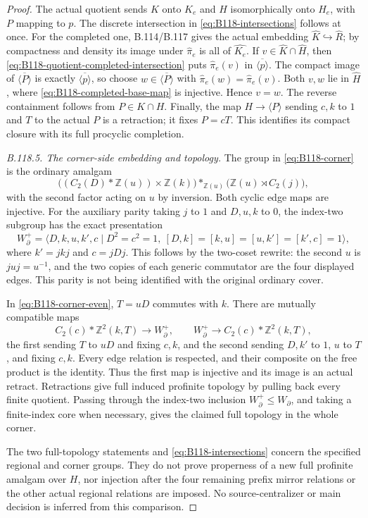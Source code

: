 \begin{proof}
The actual quotient sends $K$ onto $K_e$ and $H$ isomorphically onto
$H_e$, with $P$ mapping to $p$. The discrete intersection in
\eqref{eq:B118-intersections} follows at once. For the completed
one, B.114/B.117 gives the actual embedding
$\widehat K\hookrightarrow\widehat R$; by compactness and density
its image under $\widehat\pi_e$ is all of $\widehat{K_e}$.
If $v\in\widehat K\cap\widehat H$, then
\eqref{eq:B118-quotient-completed-intersection} puts
$\widehat\pi_e(v)$ in $\overline{\langle p\rangle}$.
The compact image of $\overline{\langle P\rangle}$ is exactly
$\overline{\langle p\rangle}$, so choose
$w\in\overline{\langle P\rangle}$ with
$\widehat\pi_e(w)=\widehat\pi_e(v)$. Both $v,w$ lie in
$\widehat H$, where \eqref{eq:B118-completed-base-map} is
injective. Hence $v=w$. The reverse containment follows from
$P\in K\cap H$. Finally, the map $H\to\langle P\rangle$
sending $c,k$ to $1$ and $T$ to the actual $P$ is a retraction;
it fixes $P=cT$. This identifies its compact closure with its full
procyclic completion.

\emph{B.118.5. The corner-side embedding and topology.}
The group in \eqref{eq:B118-corner} is the ordinary amalgam
\[
 \bigl((C_2(D)*\mathbb Z(u))\times\mathbb Z(k)\bigr)
       *_{\mathbb Z(u)}
       \bigl(\mathbb Z(u)\rtimes C_2(j)\bigr),
\]
with the second factor acting on $u$ by inversion. Both cyclic edge
maps are injective. For the auxiliary parity taking $j$ to $1$ and
$D,u,k$ to $0$, the index-two subgroup has the exact presentation
\begin{equation}\label{eq:B118-corner-even}
 W_{\partial}^{+}=
 \langle D,k,u,k',c\mid
 D^2=c^2=1,\ [D,k]=[k,u]=[u,k']=[k',c]=1\rangle,
\end{equation}
where $k'=jkj$ and $c=jDj$. This follows by the two-coset
rewrite: the second $u$ is $juj=u^{-1}$, and the two copies of
each generic commutator are the four displayed edges.
This parity is not being identified with the original ordinary cover.

In \eqref{eq:B118-corner-even}, $T=uD$ commutes with $k$.
There are mutually compatible maps
\[
 C_2(c)*\mathbb Z^2(k,T)\longrightarrow W_{\partial}^{+},
 \qquad
 W_{\partial}^{+}\longrightarrow C_2(c)*\mathbb Z^2(k,T),
\]
the first sending $T$ to $uD$ and fixing $c,k$, and the second
sending $D,k'$ to $1$, $u$ to $T$, and fixing $c,k$.
Every edge relation is respected, and their composite on the free
product is the identity. Thus the first map is injective and its
image is an actual retract. Retractions give full induced profinite
topology by pulling back every finite quotient. Passing through the
index-two inclusion $W_{\partial}^{+}\leq W_{\partial}$, and
taking a finite-index core when necessary, gives the claimed full
topology in the whole corner.

The two full-topology statements and
\eqref{eq:B118-intersections} concern the specified regional and
corner groups. They do not prove properness of a new full profinite
amalgam over $H$, nor injection after the four remaining prefix
mirror relations or the other actual regional relations are imposed.
No source-centralizer or main decision is inferred from this comparison.
\end{proof}

